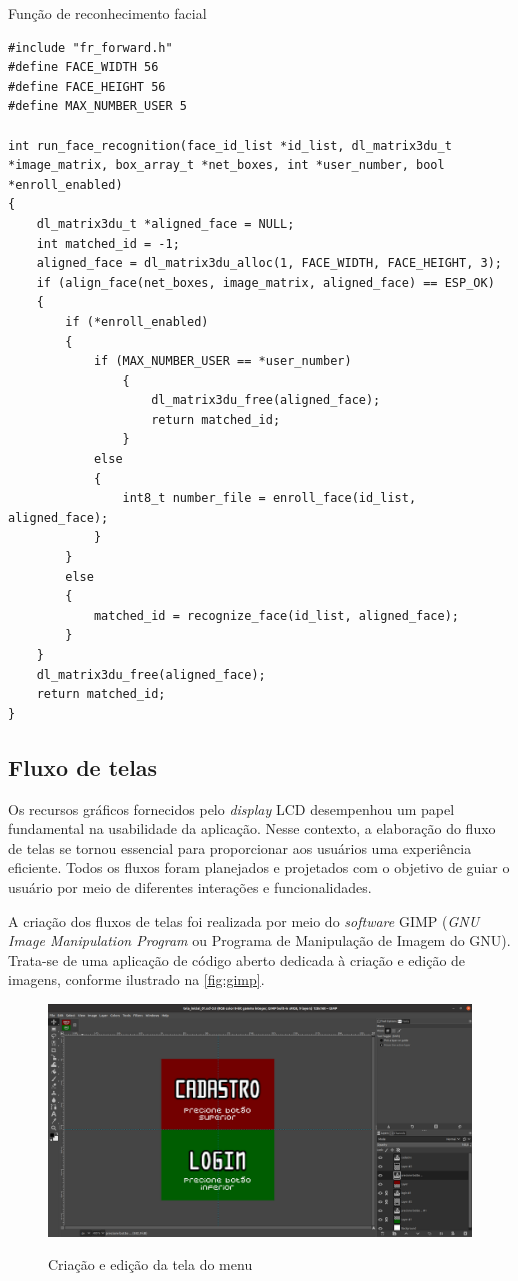 \begin{sourcecode}[htb]
\caption{\label{code:reconhecimento}Função de reconhecimento facial}
\begin{lstlisting}[frame=single]
#include "fr_forward.h"
#define FACE_WIDTH 56
#define FACE_HEIGHT 56
#define MAX_NUMBER_USER 5

int run_face_recognition(face_id_list *id_list, dl_matrix3du_t *image_matrix, box_array_t *net_boxes, int *user_number, bool *enroll_enabled)
{
    dl_matrix3du_t *aligned_face = NULL;
    int matched_id = -1;
    aligned_face = dl_matrix3du_alloc(1, FACE_WIDTH, FACE_HEIGHT, 3);
    if (align_face(net_boxes, image_matrix, aligned_face) == ESP_OK)
    {
        if (*enroll_enabled)
        {
            if (MAX_NUMBER_USER == *user_number)
			    {
				    dl_matrix3du_free(aligned_face);
				    return matched_id;
			    }
            else
            {
                int8_t number_file = enroll_face(id_list, aligned_face);
            }
        }
        else
        {
            matched_id = recognize_face(id_list, aligned_face);
        }
    }
    dl_matrix3du_free(aligned_face);
    return matched_id;
}
\end{lstlisting}
\fonte{}
\end{sourcecode}

\subsection{Fluxo de telas}\label{sec:telas}

Os recursos gráficos fornecidos pelo \textit{display} LCD desempenhou um papel 
fundamental na usabilidade da aplicação. Nesse contexto, a elaboração 
do fluxo de telas se tornou essencial para proporcionar aos usuários 
uma experiência eficiente. Todos os fluxos foram planejados e 
projetados com o objetivo de guiar o usuário por meio 
de diferentes interações e funcionalidades.

A criação dos fluxos de telas foi realizada por meio do \textit{software} GIMP 
(\textit{GNU Image Manipulation Program} ou Programa de Manipulação 
de Imagem do GNU). Trata-se de uma aplicação de código aberto 
dedicada à criação e edição de imagens, conforme ilustrado 
na \autoref{fig:gimp}.

\begin{figure}[h!]
    \centering
    \caption{Criação e edição da tela do menu}
    \includegraphics[scale=0.2]{figuras/gimp.png}
    \label{fig:gimp}
    \centering
\end{figure}

